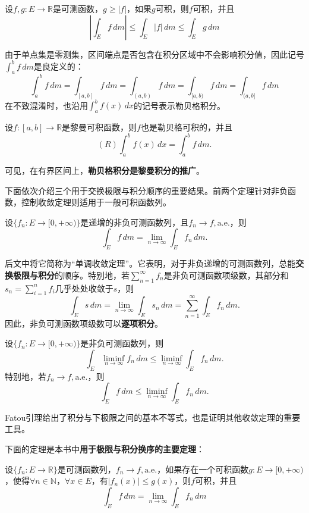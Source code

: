 \begin{theorem}[比较判别法]
    设$f,g:E\to\mathbb{R}$是可测函数，$g\geq|f|$，如果$g$可积，则$f$可积，并且
    \[\left|\int_{E}f\,dm\right|\leq \int_{E}|f|\,dm\leq \int_{E}g\,dm\]
\end{theorem}

由于单点集是零测集，区间端点是否包含在积分区域中不会影响积分值，因此记号$\int_{a}^{b}f\,dm$是良定义的：
\[\int_{a}^{b}f\,dm=\int_{[a,b]}f\,dm=\int_{(a,b)}f\,dm=\int_{[a,b)}f\,dm=\int_{(a,b]}f\,dm\]
在不致混淆时，也沿用$\int_{a}^{b}f(x)\,dx$的记号表示勒贝格积分。

\begin{theorem}
    设$f:[a,b]\to\mathbb{R}$是黎曼可积函数，则$f$也是勒贝格可积的，并且
    \[(R)\int_{a}^{b}f(x)\,dx=\int_{a}^{b}f\,dm.\]
\end{theorem}

可见，在有界区间上，\textbf{勒贝格积分是黎曼积分的推广}。

下面依次介绍三个用于交换极限与积分顺序的重要结果。前两个定理针对非负函数，控制收敛定理则适用于一般可积函数列。

\begin{theorem}[Levi单调收敛定理]
    设$\{f_n:E\to[0,+\infty)\}$是递增的非负可测函数列，且$f_n\to f,\mathrm{a.e.}$，则
    \[\int_{E}f\,dm=\lim_{n\to\infty}\int_{E}f_n\,dm.\]
\end{theorem}
后文中将它简称为“单调收敛定理”。它表明，对于非负递增的可测函数列，总能\textbf{交换极限与积分}的顺序。特别地，若$\sum_{n=1}^{\infty}f_n$是非负可测函数项级数，其部分和$s_n=\sum_{i=1}^{n}f_i$几乎处处收敛于$s$，则
\[\int_{E}s\,dm=\lim_{n\to\infty}\int_{E}s_n\,dm=\sum_{n=1}^{\infty}\int_{E}f_n\,dm.\]
因此，非负可测函数项级数可以\textbf{逐项积分}。

\begin{theorem}[Fatou引理]
    设$\{f_n:E\to[0,+\infty)\}$是非负可测函数列，则
    \[\int_{E}\liminf_{n\to\infty}f_n\,dm\leq \liminf_{n\to\infty}\int_{E}f_n\,dm.\]
    特别地，若$f_n\to f,\mathrm{a.e.}$，则
    \[\int_{E}f\,dm\leq \liminf_{n\to\infty}\int_{E}f_n\,dm.\]
\end{theorem}

Fatou引理给出了积分与下极限之间的基本不等式，也是证明其他收敛定理的重要工具。

下面的定理是本书中\textbf{用于极限与积分换序的主要定理}：
\begin{theorem}[Lebesgue控制收敛定理]
    \label{thm:DCT}
    设$\{f_n:E\to\mathbb{R}\}$是可测函数列，$f_n\to f,\mathrm{a.e.}$，如果存在一个可积函数$g:E\to[0,+\infty)$，使得$\forall n\in\mathbb{N}$，$\forall x\in E$，有$|f_n(x)|\leq g(x)$，则$f$可积，并且
    \[\int_{E}f\,dm=\lim_{n\to\infty}\int_{E}f_n\,dm\]
\end{theorem}

